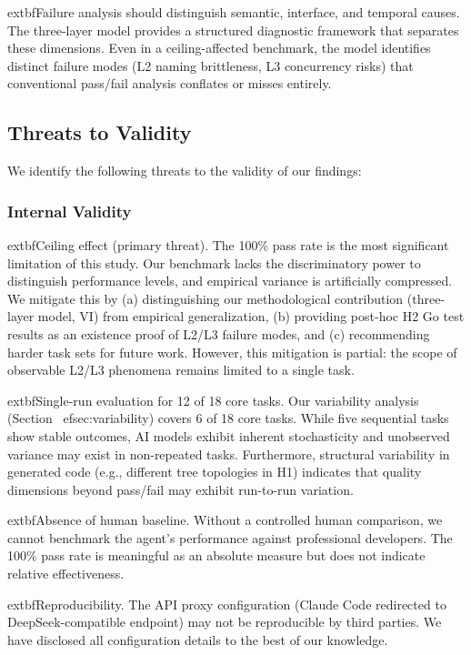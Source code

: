 \documentclass[conference]{IEEEtran}
\begin{document}
			extbf{Failure analysis should distinguish semantic, interface, and temporal causes.} The three-layer model provides a structured diagnostic framework that separates these dimensions. Even in a ceiling-affected benchmark, the model identifies distinct failure modes (L2 naming brittleness, L3 concurrency risks) that conventional pass/fail analysis conflates or misses entirely.


\subsection{Threats to Validity}

We identify the following threats to the validity of our findings:

\subsubsection{Internal Validity}

			extbf{Ceiling effect (primary threat).} The 100\% pass rate is the most significant limitation of this study. Our benchmark lacks the discriminatory power to distinguish performance levels, and empirical variance is artificially compressed. We mitigate this by (a) distinguishing our methodological contribution (three-layer model, VI) from empirical generalization, (b) providing post-hoc H2 Go test results as an existence proof of L2/L3 failure modes, and (c) recommending harder task sets for future work. However, this mitigation is partial: the scope of observable L2/L3 phenomena remains limited to a single task.

			extbf{Single-run evaluation for 12 of 18 core tasks.} Our variability analysis (Section~
ef{sec:variability}) covers 6 of 18 core tasks. While five sequential tasks show stable outcomes, AI models exhibit inherent stochasticity and unobserved variance may exist in non-repeated tasks. Furthermore, structural variability in generated code (e.g., different tree topologies in H1) indicates that quality dimensions beyond pass/fail may exhibit run-to-run variation.

			extbf{Absence of human baseline.} Without a controlled human comparison, we cannot benchmark the agent's performance against professional developers. The 100\% pass rate is meaningful as an absolute measure but does not indicate relative effectiveness.

			extbf{Reproducibility.} The API proxy configuration (Claude Code redirected to DeepSeek-compatible endpoint) may not be reproducible by third parties. We have disclosed all configuration details to the best of our knowledge.
\end{document}
